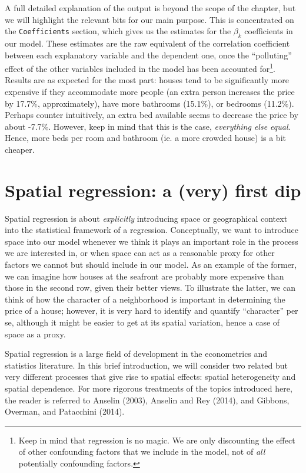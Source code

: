 \documentclass[
  letterpaper,
  krantz2]{style/krantz}
\begin{document}
A full detailed explanation of the output is beyond the scope of the
chapter, but we will highlight the relevant bits for our main purpose.
This is concentrated on the \texttt{Coefficients} section, which gives
us the estimates for the \(\beta_k\) coefficients in our model. These
estimates are the raw equivalent of the correlation coefficient between
each explanatory variable and the dependent one, once the ``polluting''
effect of the other variables included in the model has been accounted
for\footnote{Keep in mind that regression is no magic. We are only
  discounting the effect of other confounding factors that we include in
  the model, not of \emph{all} potentially confounding factors.}.
Results are as expected for the most part: houses tend to be
significantly more expensive if they accommodate more people (an extra
person increases the price by 17.7\%, approximately), have more
bathrooms (15.1\%), or bedrooms (11.2\%). Perhaps counter intuitively,
an extra bed available seems to decrease the price by about -7.7\%.
However, keep in mind that this is the case, \emph{everything else
equal}. Hence, more beds per room and bathroom (ie. a more crowded
house) is a bit cheaper.

\hypertarget{spatial-regression-a-very-first-dip}{%
\section{Spatial regression: a (very) first
dip}\label{spatial-regression-a-very-first-dip}}

Spatial regression is about \emph{explicitly} introducing space or
geographical context into the statistical framework of a regression.
Conceptually, we want to introduce space into our model whenever we
think it plays an important role in the process we are interested in, or
when space can act as a reasonable proxy for other factors we cannot but
should include in our model. As an example of the former, we can imagine
how houses at the seafront are probably more expensive than those in the
second row, given their better views. To illustrate the latter, we can
think of how the character of a neighborhood is important in determining
the price of a house; however, it is very hard to identify and quantify
``character'' per se, although it might be easier to get at its spatial
variation, hence a case of space as a proxy.

Spatial regression is a large field of development in the econometrics
and statistics literature. In this brief introduction, we will consider
two related but very different processes that give rise to spatial
effects: spatial heterogeneity and spatial dependence. For more rigorous
treatments of the topics introduced here, the reader is referred to
Anselin (2003), Anselin and Rey (2014), and Gibbons, Overman, and
Patacchini (2014).
\end{document}
